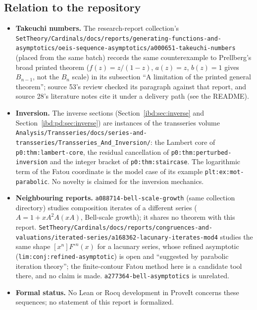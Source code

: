 \documentclass[11pt,letterpaper]{article}
\theoremstyle{remark}\newtheorem{remark}[theorem]{Remark}
\newcommand{\repopath}[1]{\nolinkurl{#1}}
\begin{document}
\subsection*{Relation to the repository}
\label{ibd:guide:repository}
\begin{itemize}
\item \textbf{Takeuchi numbers.} The research-report collection's \repopath{SetTheory/Cardinals/docs/reports/generating-functions-and-asymptotics/oeis-sequence-asymptotics/a000651-takeuchi-numbers} (placed from the same batch) records the same counterexample to Prellberg's broad printed theorem ($f(z)=z/(1-z)$, $a(z)=z$, $b(z)=1$ gives $B_{n-1}$, not the $B_n$ scale) in its subsection ``A limitation of the printed general theorem''; source 53's review checked its paragraph against that report, and source 28's literature notes cite it under a delivery path (see the README).
\item \textbf{Inversion.} The inverse sections (Section~\ref{ibd:sec:inverse} and Section~\ref{ibd:pd:sec:inverse}) are instances of the transseries volume \repopath{Analysis/Transseries/docs/series-and-transseries/Transseries_And_Inversion/}: the Lambert core of \texttt{p0:thm:lambert-core}, the residual cancellation of \texttt{p0:thm:perturbed-inversion} and the integer bracket of \texttt{p0:thm:staircase}. The logarithmic term of the Fatou coordinate is the model case of its example \texttt{plt:ex:mot-parabolic}. No novelty is claimed for the inversion mechanics.
\item \textbf{Neighbouring reports.} \repopath{a088714-bell-scale-growth} (same collection directory) studies composition iterates of a different series ($A=1+xA^2A(xA)$, Bell-scale growth); it shares no theorem with this report. \repopath{SetTheory/Cardinals/docs/reports/congruences-and-valuations/iterated-series/a168362-lacunary-iterates-mod4} studies the same shape $[x^n]F^{\circ n}(x)$ for a lacunary series, whose refined asymptotic (\texttt{lim:conj:refined-asymptotic}) is open and ``suggested by parabolic iteration theory''; the finite-contour Fatou method here is a candidate tool there, and no claim is made. \repopath{a277364-bell-asymptotics} is unrelated.
\item \textbf{Formal status.} No Lean or Rocq development in ProveIt concerns these sequences; no statement of this report is formalized.
\end{itemize}

\clearpage
\end{document}
